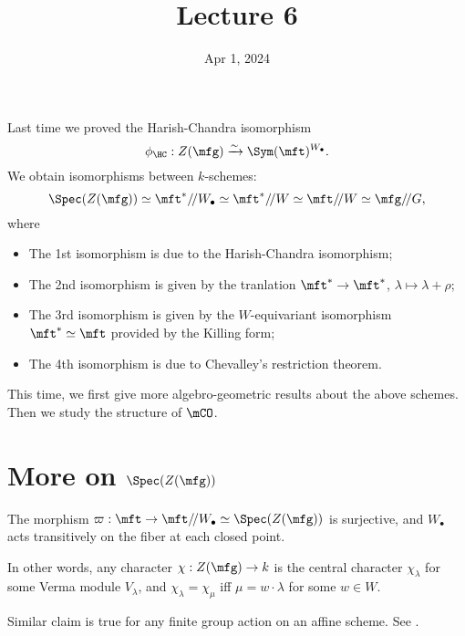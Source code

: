 





\title{Lecture 6}

\date{Apr 1, 2024}

\maketitle

	Last time we proved the Harish-Chandra isomorphism
	\[
		\phi_\HC: Z(\mfg)  \xrightarrow{\sim} \Sym(\mft)^{W_\bullet}.
	\]
	We obtain isomorphisms between $k$-schemes:
	\[
		\Spec(Z(\mfg)) \simeq \mft^*/\!/ W_\bullet\simeq \mft^*/\!/ W \simeq \mft/\!/W \simeq \mfg/\!/G,
	\]
	where
	\begin{itemize}
		\item
			The 1st isomorphism is due to the Harish-Chandra isomorphism;
		\item 
			The 2nd isomorphism is given by the tranlation $\mft^*\to \mft^*$, $\lambda \mapsto \lambda +\rho$;
		\item 
			The 3rd isomorphism is given by the $W$-equivariant isomorphism $\mft^*\simeq \mft$ provided by the Killing form;
		\item
			The 4th isomorphism is due to Chevalley's restriction theorem.
	\end{itemize}
	This time, we first give more algebro-geometric results about the above schemes. Then we study the structure of $\mCO$.


\section{More on \texorpdfstring{$\Spec(Z(\mfg))$}{Spec(Z(g)}}


	\begin{prop}[\!\!{\cite[Sect. 1.10]{H}}]
		\label{prop-good-GIT}
		The morphism $\varpi:\mft \to \mft/\!/W_\bullet \simeq \Spec(Z(\mfg))$ is surjective, and $W_\bullet$ acts transitively on the fiber at each closed point.
	\end{prop}

	\begin{rem}
		In other words, any character $\chi:Z(\mfg) \to k$ is the central character $\chi_\lambda$ for some Verma module $V_\lambda$, and $\chi_\lambda =\chi_\mu$ iff $\mu=w\cdot \lambda$ for some $w\in W$.
	\end{rem}

	\begin{rem}
		Similar claim is true for any finite group action on an affine scheme. See \cite[Exp. V, Prop. 1.1]{SGA1}.
	\end{rem}

